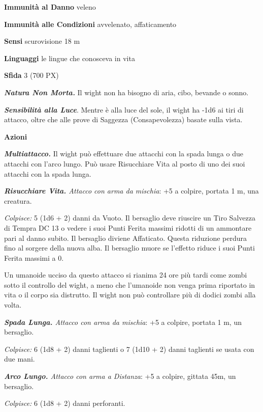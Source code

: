 \begin{multicols}{2}
\textbf{Immunità al Danno} veleno

\textbf{Immunità alle Condizioni} avvelenato, affaticamento

\textbf{Sensi} scurovisione 18 m

\textbf{Linguaggi} le lingue che conosceva in vita

\textbf{Sfida} 3 (700 PX)

\textit{\textbf{Natura Non Morta.}} Il wight non ha bisogno di aria, cibo, bevande o sonno.

\textit{\textbf{Sensibilità alla Luce}}. Mentre è alla luce del sole, il wight ha -1d6 ai tiri di attacco, oltre che alle prove di Saggezza (Consapevolezza) basate sulla vista.

\textbf{Azioni}

\textit{\textbf{Multiattacco.}} Il wight può effettuare due attacchi con la spada lunga o due attacchi con l'arco lungo. Può usare Risucchiare Vita al posto di uno dei suoi attacchi con la spada lunga.

\textit{\textbf{Risucchiare Vita.} Attacco con arma da mischia}: +5 a colpire, portata 1 m, una creatura.

\textit{Colpisce:} 5 (1d6 + 2) danni da Vuoto. Il bersaglio deve riuscire un Tiro Salvezza di Tempra DC 13 o vedere i suoi Punti Ferita massimi ridotti di un ammontare pari al danno subito. Il bersaglio diviene Affaticato. Questa riduzione perdura fino al sorgere della nuova alba. Il bersaglio muore se l'effetto riduce i suoi Punti Ferita massimi a 0.

Un umanoide ucciso da questo attacco si rianima 24 ore più tardi come zombi sotto il controllo del wight, a meno che l'umanoide non venga prima riportato in vita o il corpo sia distrutto. Il wight non può controllare più di dodici zombi alla volta.

\textit{\textbf{Spada Lunga.} Attacco con arma da mischia}: +5 a colpire, portata 1 m, un bersaglio.

\textit{Colpisce:} 6 (1d8 + 2) danni taglienti o 7 (1d10 + 2) danni taglienti se usata con due mani.

\textit{\textbf{Arco Lungo.} Attacco con arma a Distanza}: +5 a colpire, gittata 45m, un bersaglio.

\textit{Colpisce:} 6 (1d8 + 2) danni perforanti.


\end{multicols}
